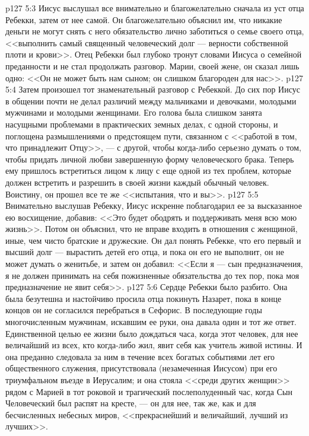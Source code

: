 \vs p127 5:3 Иисус выслушал все внимательно и благожелательно сначала из уст отца Ребекки, затем от нее самой. Он благожелательно объяснил им, что никакие деньги не могут снять с него обязательство лично заботиться о семье своего отца, <<выполнить самый священный человеческий долг --- верности собственной плоти и крови>>. Отец Ребекки был глубоко тронут словами Иисуса о семейной преданности и не стал продолжать разговор. Марии, своей жене, он сказал лишь одно: <<Он не может быть нам сыном; он слишком благороден для нас>>.
\vs p127 5:4 Затем произошел тот знаменательный разговор с Ребеккой. До сих пор Иисус в общении почти не делал различий между мальчиками и девочками, молодыми мужчинами и молодыми женщинами. Его голова была слишком занята насущными проблемами в практических земных делах, с одной стороны, и поглощена размышлениями о предстоящем пути, связанном с <<работой в том, что принадлежит Отцу>>, --- с другой, чтобы когда\hyp{}либо серьезно думать о том, чтобы придать личной любви завершенную форму человеческого брака. Теперь ему пришлось встретиться лицом к лицу с еще одной из тех проблем, которые должен встретить и разрешить в своей жизни каждый обычный человек. Воистину, он прошел все те же <<испытания, что и вы>>.
\vs p127 5:5 Внимательно выслушав Ребекку, Иисус искренне поблагодарил ее за высказанное ею восхищение, добавив: <<Это будет ободрять и поддерживать меня всю мою жизнь>>. Потом он объяснил, что не вправе входить в отношения с женщиной, иные, чем чисто братские и дружеские. Он дал понять Ребекке, что его первый и высший долг --- вырастить детей его отца, и пока он его не выполнит, он не может думать о женитьбе, и затем он добавил: <<Если я --- сын предназначения, я не должен принимать на себя пожизненные обязательства до тех пор, пока моя предназначение не явит себя>>.
\vs p127 5:6 Сердце Ребекки было разбито. Она была безутешна и настойчиво просила отца покинуть Назарет, пока в конце концов он не согласился перебраться в Сефорис. В последующие годы многочисленным мужчинам, искавшим ее руки, она давала один и тот же ответ. Единственной целью ее жизни было дождаться часа, когда этот человек, для нее величайший из всех, кто когда\hyp{}либо жил, явит себя как учитель живой истины. И она преданно следовала за ним в течение всех богатых событиями лет его общественного служения, присутствовала (незамеченная Иисусом) при его триумфальном въезде в Иерусалим; и она стояла <<среди других женщин>> рядом с Марией в тот роковой и трагический послеполуденный час, когда Сын Человеческий был распят на кресте, --- он для нее, так же, как и для бесчисленных небесных миров, <<прекраснейший и величайший, лучший из лучших>>.
